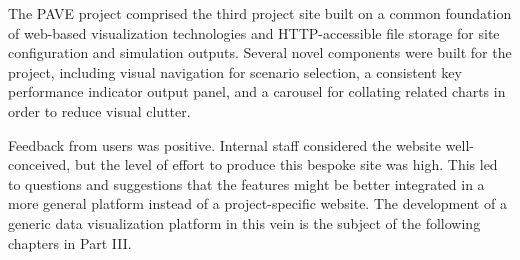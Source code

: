 The PAVE project comprised the third project site built on a common foundation of web-based visualization technologies and HTTP-accessible file storage for site configuration and simulation outputs. Several novel components were built for the project, including visual navigation for scenario selection, a consistent key performance indicator output panel, and a carousel for collating related charts in order to reduce visual clutter.

Feedback from users was positive. Internal staff considered the website well-conceived, but the level of effort to produce this bespoke site was high. This led to questions and suggestions that the features might be better integrated in a more general platform instead of a project-specific website. The development of a generic data visualization platform in this vein is the subject of the following chapters in Part III.
